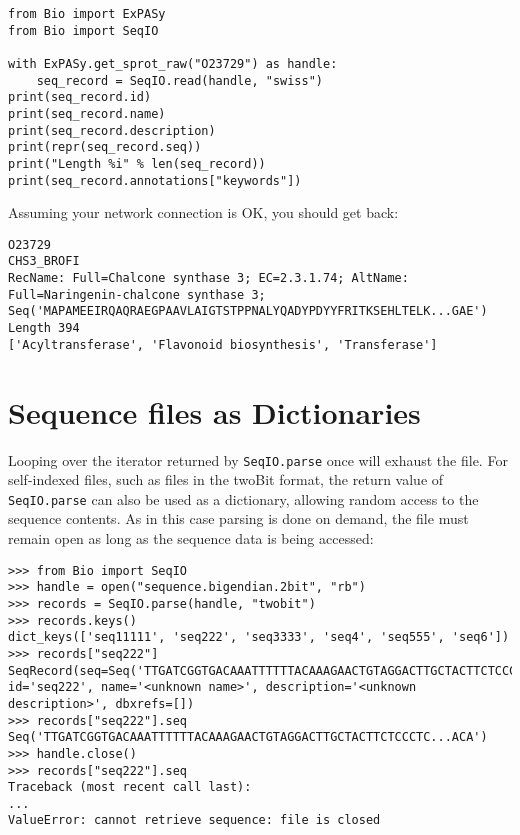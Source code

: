 \begin{verbatim}
from Bio import ExPASy
from Bio import SeqIO

with ExPASy.get_sprot_raw("O23729") as handle:
    seq_record = SeqIO.read(handle, "swiss")
print(seq_record.id)
print(seq_record.name)
print(seq_record.description)
print(repr(seq_record.seq))
print("Length %i" % len(seq_record))
print(seq_record.annotations["keywords"])
\end{verbatim}

\noindent Assuming your network connection is OK, you should get back:

\begin{verbatim}
O23729
CHS3_BROFI
RecName: Full=Chalcone synthase 3; EC=2.3.1.74; AltName: Full=Naringenin-chalcone synthase 3;
Seq('MAPAMEEIRQAQRAEGPAAVLAIGTSTPPNALYQADYPDYYFRITKSEHLTELK...GAE')
Length 394
['Acyltransferase', 'Flavonoid biosynthesis', 'Transferase']
\end{verbatim}

\section{Sequence files as Dictionaries}

Looping over the iterator returned by \verb|SeqIO.parse| once will exhaust the file. For self-indexed files, such as files in the twoBit format, the return value of \verb|SeqIO.parse| can also be used as a dictionary, allowing random access to the sequence contents. As in this case parsing is done on demand, the file must remain open as long as the sequence data is being accessed:

\begin{verbatim}
>>> from Bio import SeqIO
>>> handle = open("sequence.bigendian.2bit", "rb")
>>> records = SeqIO.parse(handle, "twobit")
>>> records.keys()
dict_keys(['seq11111', 'seq222', 'seq3333', 'seq4', 'seq555', 'seq6'])
>>> records["seq222"]
SeqRecord(seq=Seq('TTGATCGGTGACAAATTTTTTACAAAGAACTGTAGGACTTGCTACTTCTCCCTC...ACA'), id='seq222', name='<unknown name>', description='<unknown description>', dbxrefs=[])
>>> records["seq222"].seq
Seq('TTGATCGGTGACAAATTTTTTACAAAGAACTGTAGGACTTGCTACTTCTCCCTC...ACA')
>>> handle.close()
>>> records["seq222"].seq
Traceback (most recent call last):
...
ValueError: cannot retrieve sequence: file is closed
\end{verbatim}

